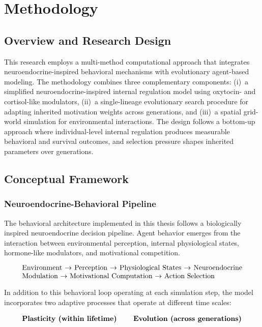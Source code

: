 \chapter{Methodology}

\section{Overview and Research Design}
\begin{sloppypar}
This research employs a multi-method computational approach that integrates neuroendocrine-\allowbreak inspired behavioral mechanisms with evolutionary agent-based modeling.
The methodology combines three complementary components:
(i)~a simplified neuroendocrine-\allowbreak inspired internal regulation model using oxytocin- and cortisol-like modulators,
(ii)~a single-lineage evolutionary search procedure for adapting inherited motivation weights across generations, and
(iii)~a spatial grid-world simulation for environmental interactions.
The design follows a bottom-up approach where individual-level internal regulation produces measurable behavioral and survival outcomes, and selection pressure shapes inherited parameters over generations.
\end{sloppypar}


\section{Conceptual Framework}
\subsection{Neuroendocrine-Behavioral Pipeline}

The behavioral architecture implemented in this thesis follows a biologically inspired neuroendocrine decision pipeline. Agent behavior emerges from the interaction between environmental perception, internal physiological states, hormone-like modulators, and motivational competition.

\[
\parbox{0.9\linewidth}{
Environment $\rightarrow$ Perception $\rightarrow$ 
Physiological States $\rightarrow$ Neuroendocrine Modulation 
$\rightarrow$ Motivational Computation $\rightarrow$ Action Selection
}
\]

In addition to this behavioral loop operating at each simulation step, the model incorporates two adaptive processes that operate at different time scales:

\[
\parbox{0.9\linewidth}{
\textbf{Plasticity (within lifetime)} \qquad
\textbf{Evolution (across generations)}
}
\]

